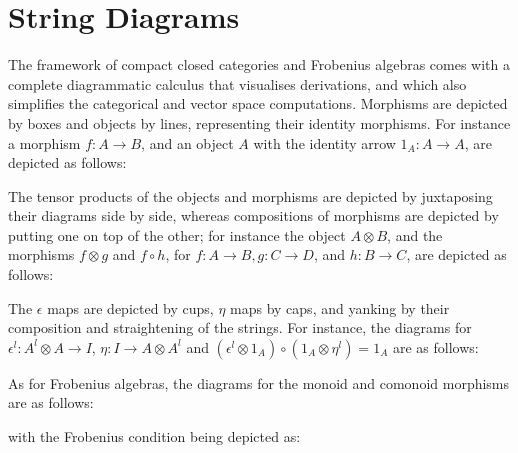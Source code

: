 \section{String Diagrams} 
\label{string}

The framework of compact closed categories and Frobenius algebras
comes with a complete diagrammatic calculus that visualises
derivations, and which also simplifies the
categorical and vector space computations. Morphisms are depicted by
boxes and objects by lines, representing their identity morphisms. For
instance a morphism $f \colon A \to B$, and an object $A$ with the
identity arrow $1_A \colon A \to A$, are depicted as follows:

\begin{center}
\end{center}

The tensor products of the objects and morphisms are depicted by
juxtaposing their diagrams side by side, whereas compositions of
morphisms are depicted by putting one on top of the other; for instance
the object $A \otimes B$, and the morphisms $f \otimes g$ and $f \circ
h$, for $f \colon A \to B, g \colon C \to D$, and $h \colon B \to C$,
are depicted as follows:

\begin{center}
\end{center}

The $\epsilon$ maps are depicted by cups, $\eta$ maps by caps, and
yanking by their composition and straightening of the strings.  For
instance, the diagrams for $\epsilon^l \colon A^l \otimes A \to I$,
$\eta \colon I \to A\otimes A^l$ and $(\epsilon^l \otimes 1_A) \circ
(1_A \otimes \eta^l) = 1_A$ are as follows:

\begin{center}
  \qquad
\end{center}

 
As for Frobenius algebras, the diagrams for the  monoid and  comonoid 
morphisms are as follows:

\begin{center}
\end{center} 
 
\noindent
with the Frobenius condition being depicted as:

\begin{center}
\end{center} 

